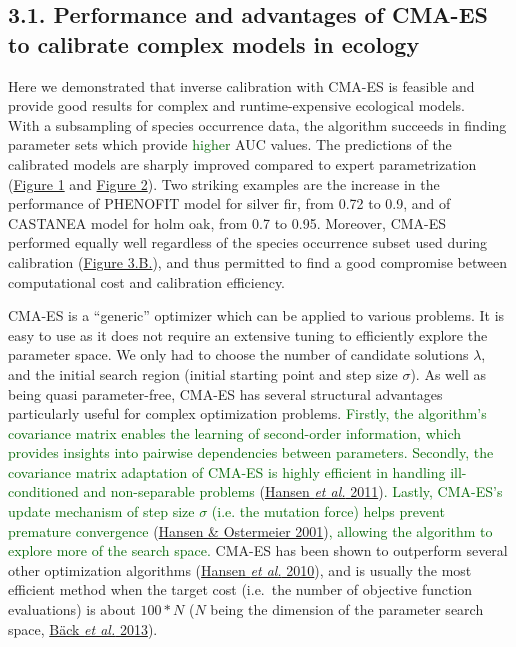 \documentclass[11pt,]{article}
\begin{document}
\hypertarget{performance-and-advantages-of-cma-es-to-calibrate-complex-models-in-ecology}{%
\subsection{3.1. Performance and advantages of CMA-ES to calibrate
complex models in
ecology}\label{performance-and-advantages-of-cma-es-to-calibrate-complex-models-in-ecology}}

Here we demonstrated that inverse calibration with CMA-ES is feasible
and provide good results for complex and runtime-expensive ecological
models.\\
With a subsampling of species occurrence data, the algorithm succeeds in
finding parameter sets which provide \textcolor{darkgreen}{higher} AUC
values. The predictions of the calibrated models are sharply improved
compared to expert parametrization
(\hyperref[fig:phenofitmaps]{Figure 1} and
\hyperref[fig:castaneamaps]{Figure 2}). Two striking examples are the
increase in the performance of PHENOFIT model for silver fir, from 0.72
to 0.9, and of CASTANEA model for holm oak, from 0.7 to 0.95. Moreover,
CMA-ES performed equally well regardless of the species occurrence
subset used during calibration
(\hyperref[fig:cmaesrepAUCcal]{Figure 3.B.}), and thus permitted to find
a good compromise between computational cost and calibration efficiency.

CMA-ES is a ``generic'' optimizer which can be applied to various
problems. It is easy to use as it does not require an extensive tuning
to efficiently explore the parameter space. We only had to choose the
number of candidate solutions \(\lambda\), and the initial search region
(initial starting point and step size \(\sigma\)). As well as being
quasi parameter-free, CMA-ES has several structural advantages
particularly useful for complex optimization problems.
\textcolor{darkgreen}{Firstly, the algorithm's covariance matrix enables the learning of second-order information, which provides insights into pairwise dependencies between parameters. Secondly, the covariance matrix adaptation of CMA-ES is highly efficient in handling ill-conditioned and non-separable problems }(\protect\hyperlink{ref-Hansen2011}{Hansen
\emph{et al.}
2011})\textcolor{darkgreen}{. Lastly, CMA-ES's update mechanism of step size $\sigma$ (i.e. the mutation force) helps prevent premature convergence }(\protect\hyperlink{ref-Hansen2001}{Hansen
\& Ostermeier
2001})\textcolor{darkgreen}{, allowing the algorithm to explore more of the search space.}
CMA-ES has been shown to outperform several other optimization
algorithms (\protect\hyperlink{ref-Hansen2010}{Hansen \emph{et al.}
2010}), and is usually the most efficient method when the target cost
(i.e.~the number of objective function evaluations) is about \(100*N\)
(\(N\) being the dimension of the parameter search space,
\protect\hyperlink{ref-Baeck2013}{Bäck \emph{et al.} 2013}).
\end{document}
